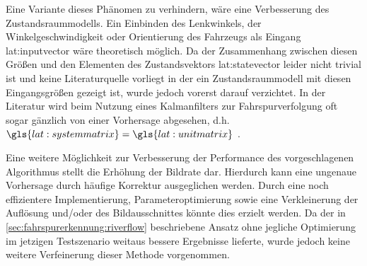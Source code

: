 Eine Variante dieses Phänomen zu verhindern, wäre eine Verbesserung des Zustandsraummodells. 
Ein Einbinden des Lenkwinkels, der Winkelgeschwindigkeit oder Orientierung des Fahrzeugs als Eingang \gls{lat:inputvector} wäre theoretisch möglich. Da der Zusammenhang zwischen diesen Größen und den Elementen des Zustandsvektors \gls{lat:statevector} leider nicht trivial ist und keine Literaturquelle vorliegt in der ein Zustandsraummodell mit diesen Eingangsgrößen gezeigt ist, wurde jedoch vorerst darauf verzichtet. In der Literatur wird beim Nutzung eines Kalmanfilters zur Fahrspurverfolgung oft sogar gänzlich von einer Vorhersage abgesehen, d.h. \(\gls{lat:systemmatrix}=\gls{lat:unitmatrix}\) \autocite{limRiverFlowLane2012}.

Eine weitere Möglichkeit zur Verbesserung der Performance des vorgeschlagenen Algorithmus stellt die Erhöhung der Bildrate dar. Hierdurch kann eine ungenaue Vorhersage durch häufige Korrektur ausgeglichen werden. Durch eine noch effizientere Implementierung, Parameteroptimierung sowie eine Verkleinerung der Auflösung und/oder des Bildausschnittes könnte dies erzielt werden. Da der in \ref{sec:fahrspurerkennung:riverflow} beschriebene Ansatz ohne jegliche Optimierung im jetzigen Testszenario weitaus bessere Ergebnisse lieferte, wurde jedoch keine weitere Verfeinerung dieser Methode vorgenommen.
